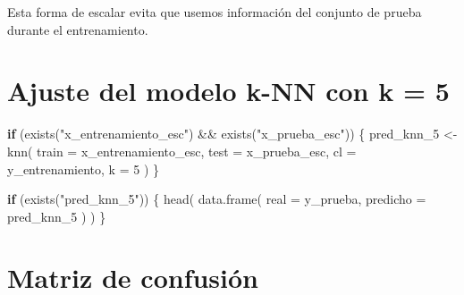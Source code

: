 \documentclass[
  11pt,
  letterpaper,
]{book}
\newenvironment{Shaded}{\begin{snugshade}}{\end{snugshade}}
\newcommand{\AttributeTok}[1]{\textcolor[rgb]{0.40,0.45,0.13}{#1}}
\newcommand{\ControlFlowTok}[1]{\textcolor[rgb]{0.00,0.23,0.31}{\textbf{#1}}}
\newcommand{\DecValTok}[1]{\textcolor[rgb]{0.68,0.00,0.00}{#1}}
\newcommand{\FunctionTok}[1]{\textcolor[rgb]{0.28,0.35,0.67}{#1}}
\newcommand{\NormalTok}[1]{\textcolor[rgb]{0.00,0.23,0.31}{#1}}
\newcommand{\OtherTok}[1]{\textcolor[rgb]{0.00,0.23,0.31}{#1}}
\newcommand{\SpecialCharTok}[1]{\textcolor[rgb]{0.37,0.37,0.37}{#1}}
\newcommand{\StringTok}[1]{\textcolor[rgb]{0.13,0.47,0.30}{#1}}
\begin{document}
Esta forma de escalar evita que usemos información del conjunto de
prueba durante el entrenamiento.

\section{Ajuste del modelo k-NN con k =
5}\label{ajuste-del-modelo-k-nn-con-k-5}

\begin{Shaded}
\begin{Highlighting}[]
\ControlFlowTok{if}\NormalTok{ (}\FunctionTok{exists}\NormalTok{(}\StringTok{"x\_entrenamiento\_esc"}\NormalTok{) }\SpecialCharTok{\&\&} \FunctionTok{exists}\NormalTok{(}\StringTok{"x\_prueba\_esc"}\NormalTok{)) \{}
\NormalTok{  pred\_knn\_5 }\OtherTok{\textless{}{-}} \FunctionTok{knn}\NormalTok{(}
    \AttributeTok{train =}\NormalTok{ x\_entrenamiento\_esc,}
    \AttributeTok{test =}\NormalTok{ x\_prueba\_esc,}
    \AttributeTok{cl =}\NormalTok{ y\_entrenamiento,}
    \AttributeTok{k =} \DecValTok{5}
\NormalTok{  )}
\NormalTok{\}}
\end{Highlighting}
\end{Shaded}

\begin{Shaded}
\begin{Highlighting}[]
\ControlFlowTok{if}\NormalTok{ (}\FunctionTok{exists}\NormalTok{(}\StringTok{"pred\_knn\_5"}\NormalTok{)) \{}
  \FunctionTok{head}\NormalTok{(}
    \FunctionTok{data.frame}\NormalTok{(}
      \AttributeTok{real =}\NormalTok{ y\_prueba,}
      \AttributeTok{predicho =}\NormalTok{ pred\_knn\_5}
\NormalTok{    )}
\NormalTok{  )}
\NormalTok{\}}
\end{Highlighting}
\end{Shaded}

\section{Matriz de confusión}\label{matriz-de-confusiuxf3n-1}
\end{document}
